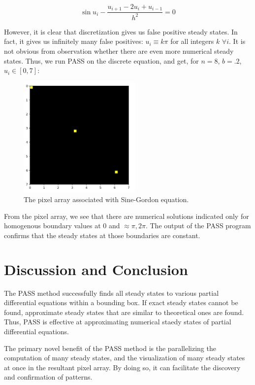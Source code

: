 \documentclass[11pt]{article}
\begin{document}
\begin{equation}
    \label{discrete SG}
    \sin u_i - \frac{u_{i+1} - 2u_i + u_{i-1}}{h^2} = 0
\end{equation}

However, it is clear that discretization gives us false positive steady states. In fact, it gives us infinitely many false positives: $u_i \equiv k\pi$ for all integers $k$ $\forall i$. It is not obvious from observation whether there are even more numerical steady states. Thus, we run PASS on the discrete equation, and get, for $n = 8$, $b = .2$, $u_i \in [0,7]$:

\begin{figure}[h]
\centering
\includegraphics[width=6cm]{images/SG.png}
\caption{The pixel array associated with Sine-Gordon equation.}
\label{sgPixel}
\end{figure}

From the pixel array, we see that there are numerical solutions indicated only for homogenous boundary values at 0 and $\approx \pi, 2\pi$. The output of the PASS program confirms that the steady states at those boundaries are constant.

\section{Discussion and Conclusion}

The PASS method successfully finds all steady states to various partial differential equations within a bounding box. If exact steady states cannot be found, approximate steady states that are similar to theoretical ones are found. Thus, PASS is effective at approximating numerical staedy states of partial differential equations.

The primary novel benefit of the PASS method is the parallelizing the computation of many steady states, and the visualization of many steady states at once in the resultant pixel array. By doing so, it can facilitate the discovery and confirmation of patterns.
\end{document}
